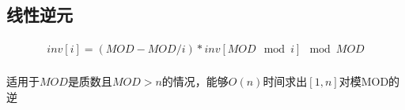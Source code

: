 ﻿\subsection{线性逆元}
\paragraph{}
\begin{align*} inv[i] = ( MOD - MOD / i ) * inv[MOD \mod i] \mod MOD \end{align*} \\ 
适用于$ MOD $是质数且$ MOD > n $的情况，能够$ O(n) $时间求出$ [1, n] $对模MOD的逆
